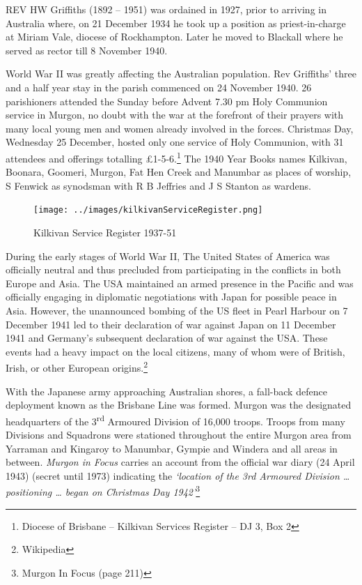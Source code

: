 \lettrine[lines=3]{R}{EV}
 HW Griffiths (1892 -- 1951) was ordained in 1927, prior to arriving in Australia where, on 21 December 1934 he took up a position as priest-in-charge at Miriam Vale, diocese of Rockhampton. Later he moved to Blackall where he served as rector till 8 November 1940.

World War II was greatly affecting the Australian population. Rev Griffiths' three and a half year stay in the parish commenced on 24 November 1940. 26 parishioners attended the Sunday before Advent 7.30 pm Holy Communion service in Murgon, no doubt with the war at the forefront of their prayers with many local young men and women already involved in the forces. Christmas Day, Wednesday 25 December, hosted only one service of Holy Communion, with 31 attendees and offerings totalling \pounds1-5-6.\footnote{Diocese of Brisbane -- Kilkivan Services Register -- DJ 3, Box 2} The 1940 Year Books names Kilkivan, Boonara, Goomeri, Murgon, Fat Hen Creek and Manumbar as places of worship, S Fenwick as synodsman with R B Jeffries and J S Stanton as wardens.








\begin{figure}
\begin{center}
\texttt{[image: ../images/kilkivanServiceRegister.png]}
\caption{Kilkivan Service Register 1937-51}
\end{center}
\end{figure}




During the early stages of World War II, The United States of America was officially neutral and thus precluded from participating in the conflicts in both Europe and Asia. The USA maintained an armed presence in the Pacific and was officially engaging in diplomatic negotiations with Japan for possible peace in Asia. However, the unannounced bombing of the US fleet in Pearl Harbour on 7 December 1941 led to their declaration of war against Japan on 11 December 1941 and Germany's subsequent declaration of war against the USA. These events had a heavy impact on the local citizens, many of whom were of British, Irish, or other European origins.\footnote{Wikipedia}


With the Japanese army approaching Australian shores, a fall-back defence deployment known as the Brisbane Line was formed. Murgon was the designated headquarters of the 3\textsuperscript{rd} Armoured Division of 16,000 troops. Troops from many Divisions and Squadrons were stationed throughout the entire Murgon area from Yarraman and Kingaroy to Manumbar, Gympie and Windera and all areas in between. \emph{Murgon in Focus} carries an account from the official war diary (24 April 1943) (secret until 1973) indicating the \emph{`location of the 3rd Armoured Division \ldots{} positioning \ldots{} began on Christmas Day 1942'}\footnote{Murgon In Focus (page 211)}


